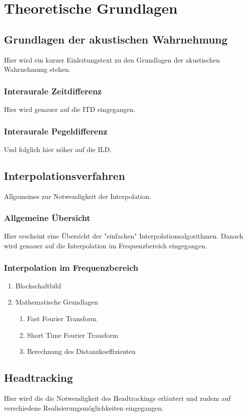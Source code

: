 \chapter[Theoretische Grundlagen]{Theoretische Grundlagen} \label{chap:2_THEO}

\section{Grundlagen der akustischen Wahrnehmung}
\label{sec:2_GDAW}
    
    Hier wird ein kurzer Einleitungstext zu den Grundlagen der akustischen Wahrnehmung stehen.
    
    \subsection{Interaurale Zeitdifferenz}
    \label{subsec:2_ITD}
        
        Hier wird genauer auf die ITD eingegangen.
    
    \subsection{Interaurale Pegeldifferenz}
    \label{subsec:2_ILD}
    
        Und folglich hier nöher auf die ILD.

    
\section{Interpolationsverfahren}
\label{sec:2_IV}

Allgemeines zur Notwendigkeit der Interpolation.

    \subsection{Allgemeine Übersicht}
    \label{subsec:2_AUE}

    Hier erscheint eine Übersicht der "{}einfachen"{}  Interpolationsalgorithmen. Danach wird genauer auf die Interpolation im Frequenzbereich eingegangen.
    
    \subsection{Interpolation im Frequenzbereich}
    \label{subsec:ILD}

    
        \begin{enumerate}
            \item Blockschaltbild
            \item Mathematische Grundlagen
            \begin{enumerate}
                \item Fast Fourier Transform
                \item Short Time Fourier Transform
                \item Berechnung des Distanzkoeffizienten
            \end{enumerate}    
        \end{enumerate}

\section{Headtracking}
\label{sec:2_HT}

Hier wird die die Notwendigkeit des Headtrackings erläutert und zudem auf verschiedene Realisierungsmöglichkeiten eingegangen.